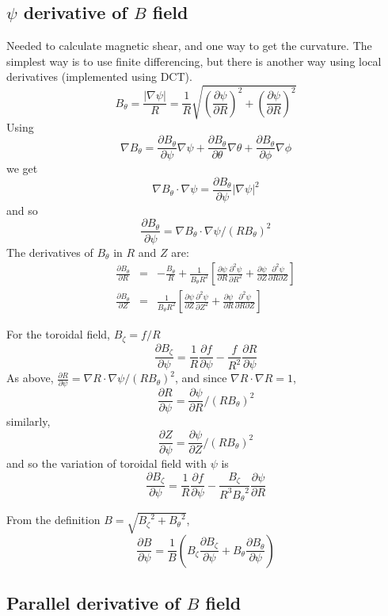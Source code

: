 \documentclass[12pt]{article}
\newcommand{\deriv}[2]{\ensuremath{\frac{\partial #1}{\partial #2}}}
\newcommand{\dderiv}[2]{\ensuremath{\frac{\partial^2 #1}{\partial {#2}^2}}}
\newcommand{\Bp}{\ensuremath{B_\theta}}
\newcommand{\Bt}{\ensuremath{B_\zeta}}
\begin{document}
\subsection{$\psi$ derivative of $B$ field}

Needed to calculate magnetic shear, and one way to get the curvature.
The simplest way is to use finite differencing, but there is another way
using local derivatives (implemented using DCT).
\[
\Bp = \frac{\left|\nabla\psi\right|}{R} = \frac{1}{R}\sqrt{\left(\deriv{\psi}{R}\right)^2 + \left(\deriv{\psi}{R}\right)^2}
\]
Using
\[
\nabla\Bp = \deriv{\Bp}{\psi}\nabla\psi + \deriv{\Bp}{\theta}\nabla\theta + \deriv{\Bp}{\phi}\nabla\phi
\]
we get
\[
\nabla\Bp \cdot\nabla\psi = \deriv{\Bp}{\psi}\left|\nabla\psi\right|^2
\]
and so
\[
\deriv{\Bp}{\psi} = \nabla\Bp \cdot\nabla\psi / \left(R\Bp\right)^2
\]
The derivatives of $\Bp$ in $R$ and $Z$ are:
\begin{eqnarray*}
\deriv{\Bp}{R} &=& -\frac{\Bp}{R} + \frac{1}{\Bp R^2}\left[\deriv{\psi}{R}\dderiv{\psi}{R} + \deriv{\psi}{Z}\frac{\partial^2\psi}{\partial R\partial Z}\right] \\
\deriv{\Bp}{Z} &=& \frac{1}{\Bp R^2}\left[\deriv{\psi}{Z}\dderiv{\psi}{Z} + \deriv{\psi}{R}\frac{\partial^2\psi}{\partial R\partial Z}\right]
\end{eqnarray*}

For the toroidal field, $\Bt = f/R$
\[
\deriv{\Bt}{\psi} = \frac{1}{R}\deriv{f}{\psi} - \frac{f}{R^2}\deriv{R}{\psi}
\]
As above, $\deriv{R}{\psi} = \nabla R \cdot\nabla\psi / \left(R\Bp\right)^2$,
and since $\nabla R\cdot\nabla R = 1$,
\[
\deriv{R}{\psi} = \deriv{\psi}{R} / \left(R\Bp\right)^2
\]
similarly,
\[
\deriv{Z}{\psi} = \deriv{\psi}{Z} / \left(R\Bp\right)^2
\]
and so the variation of toroidal field with $\psi$ is
\[
\deriv{\Bt}{\psi} = \frac{1}{R}\deriv{f}{\psi} - \frac{\Bt}{R^3\Bp^2}\deriv{\psi}{R}
\]

From the definition $B=\sqrt{\Bt^2 + \Bp^2}$, 
\[
\deriv{B}{\psi} = \frac{1}{B}\left(\Bt\deriv{\Bt}{\psi} + \Bp\deriv{\Bp}{\psi}\right)
\]

\subsection{Parallel derivative of $B$ field}
\end{document}
